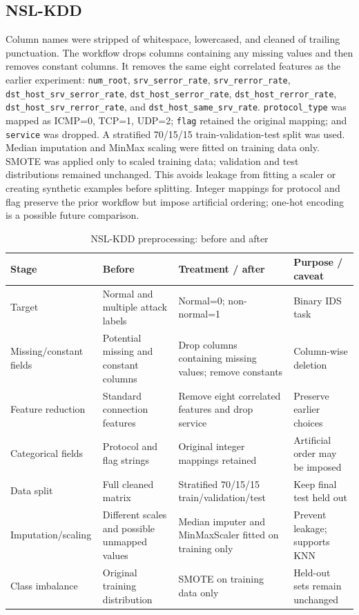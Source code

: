 \documentclass[conference]{IEEEtran}
\begin{document}
\subsection{NSL-KDD}
Column names were stripped of whitespace, lowercased, and cleaned of trailing punctuation. The workflow drops columns containing any missing values and then removes constant columns. It removes the same eight correlated features as the earlier experiment: \texttt{num\_root}, \texttt{srv\_serror\_rate}, \texttt{srv\_rerror\_rate}, \texttt{dst\_host\_srv\_serror\_rate}, \texttt{dst\_host\_serror\_rate}, \texttt{dst\_host\_rerror\_rate}, \texttt{dst\_host\_srv\_rerror\_rate}, and \texttt{dst\_host\_same\_srv\_rate}. \texttt{protocol\_type} was mapped as ICMP=0, TCP=1, UDP=2; \texttt{flag} retained the original mapping; and \texttt{service} was dropped.
A stratified 70/15/15 train-validation-test split was used. Median imputation and MinMax scaling were fitted on training data only. SMOTE was applied only to scaled training data; validation and test distributions remained unchanged. This avoids leakage from fitting a scaler or creating synthetic examples before splitting. Integer mappings for protocol and flag preserve the prior workflow but impose artificial ordering; one-hot encoding is a possible future comparison.
\begin{table}[t]
\caption{NSL-KDD preprocessing: before and after}
\centering\small
\begin{tabular}{p{}p{}p{}p{}}
\toprule Stage & Before & Treatment / after & Purpose / caveat\\\midrule
Target & Normal and multiple attack labels & Normal=0; non-normal=1 & Binary IDS task\\
Missing/constant fields & Potential missing and constant columns & Drop columns containing missing values; remove constants & Column-wise deletion\\
Feature reduction & Standard connection features & Remove eight correlated features and drop service & Preserve earlier choices\\
Categorical fields & Protocol and flag strings & Original integer mappings retained & Artificial order may be imposed\\
Data split & Full cleaned matrix & Stratified 70/15/15 train/validation/test & Keep final test held out\\
Imputation/scaling & Different scales and possible unmapped values & Median imputer and MinMaxScaler fitted on training only & Prevent leakage; supports KNN\\
Class imbalance & Original training distribution & SMOTE on training data only & Held-out sets remain unchanged\\
\bottomrule
\end{tabular}
\end{table}
\end{document}
